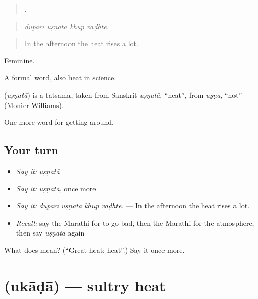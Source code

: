 \begin{quote}
   .
\end{quote}

\begin{quote}
\emph{dupārī uṣṇatā khūp vāḍhte.}
\end{quote}

\begin{quote}
In the afternoon the heat rises a lot.
\end{quote}

Feminine.

A formal word, also heat in science.

\begin{cousinweb}
\textbf{} (\emph{uṣṇatā}) is a tatsama, taken from Sanskrit \emph{uṣṇatā}, \textquotedblleft{}heat\textquotedblright{}, from \emph{uṣṇa}, \textquotedblleft{}hot\textquotedblright{} (Monier-Williams).
\end{cousinweb}

\begin{grammarlens}[title={What you've built}]
One more word for getting around.
\end{grammarlens}

\subsection*{Your turn}
\begin{itemize}
\raggedright
  \item \emph{Say it:} \emph{uṣṇatā}
  \item \emph{Say it:} \emph{uṣṇatā}, once more
  \item \emph{Say it:} \emph{dupārī uṣṇatā khūp vāḍhte.} — In the afternoon the heat rises a lot.
  \item \emph{Recall:} say the Marathi for to go bad, then the Marathi for the atmosphere, then say \emph{uṣṇatā} again
\end{itemize}

\begin{tcolorbox}[breakable,colback=teal!4,colframe=teal!35!black,title={Before you move on}]
What does  mean? (\textquotedblleft{}Great heat; heat\textquotedblright{}.) Say it once more.
\end{tcolorbox}
\section[\texorpdfstring{\mr{उकाडा} (ukāḍā)}{उकाडा (ukāḍā)}]{ (ukāḍā) — sultry heat}

